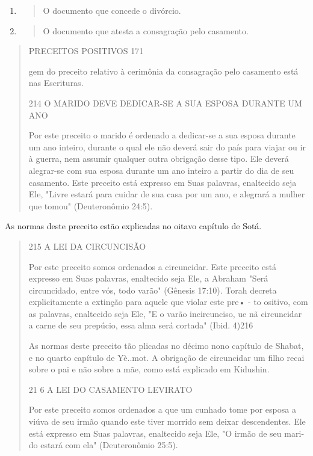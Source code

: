 \begin{enumerate}
\def\labelenumi{\arabic{enumi}.}
\setcounter{enumi}{213}
\item
  \begin{quote}
  O documento que concede o divórcio.
  \end{quote}
\item
  \begin{quote}
  O documento que atesta a consagração pelo casamento.
  \end{quote}
\end{enumerate}

\begin{quote}
PRECEITOS POSITIVOS 171

gem do preceito relativo à cerimônia da consagração pelo casamento está
nas Escrituras.

214 O MARIDO DEVE DEDICAR-SE A SUA ESPOSA DURANTE UM ANO

Por este preceito o marido é ordenado a dedicar-se a sua esposa du­rante
um ano inteiro, durante o qual ele não deverá sair do país para viajar
ou ir à guerra, nem assumir qualquer outra obrigação desse tipo. Ele
deverá alegrar-se com sua esposa durante um ano inteiro a partir do dia
de seu casamento. Este preceito está expresso em Suas palavras,
enaltecido seja Ele, "Livre estará para cuidar de sua casa por um ano, e
alegrará a mulher que tomou" (Deutero­nômio 24:5).
\end{quote}

As normas deste preceito estão explicadas no oitavo capítulo de Sotá.

\begin{quote}
215 A LEI DA CIRCUNCISÃO

Por este preceito somos ordenados a circuncidar. Este preceito está
expresso em Suas palavras, enaltecido seja Ele, a Abraham "Será
circuncidado, entre vós, todo varão" (Gênesis 17:10). Torah decreta
explicitamente a ex­tinção para aquele que violar este pre• - to
ositivo, com as palavras, enalteci­do seja Ele, "E o varão incircunciso,
ue nã circuncidar a carne de seu prepú­cio, essa alma será cortada"
(Ibid. 4)216

As normas deste preceito tão plicadas no décimo nono capítulo de Shabat,
e no quarto capítulo de Yè..mot. A obrigação de circuncidar um filho
recai sobre o pai e não sobre a mãe, como está explicado em Kidushin.

21 6 A LEI DO CASAMENTO LEVIRATO

Por este preceito somos ordenados a que um cunhado tome por es­posa a
viúva de seu irmão quando este tiver morrido sem deixar descendentes.
Ele está expresso em Suas palavras, enaltecido seja Ele, "O irmão de seu
mari­do estará com ela" (Deuteronômio 25:5).
\end{quote}

